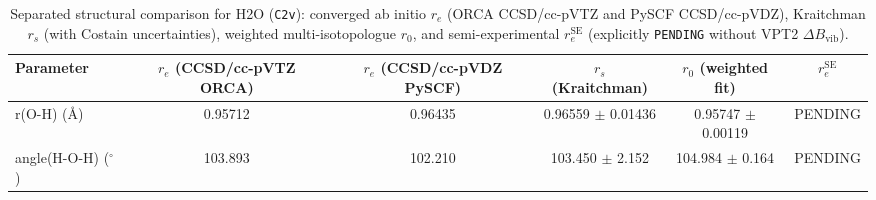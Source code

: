 \begin{table}[h!]
\centering
\caption{Separated structural comparison for H2O (\texttt{C2v}): converged ab initio $r_e$ (ORCA CCSD/cc-pVTZ and PySCF CCSD/cc-pVDZ), Kraitchman $r_s$ (with Costain uncertainties), weighted multi-isotopologue $r_0$, and semi-experimental $r_e^{\text{SE}}$ (explicitly \texttt{PENDING} without VPT2 $\Delta B_{\text{vib}}$).}
\begin{tabular}{l c c c c c}
\hline\hline
Parameter & $r_e$ (CCSD/cc-pVTZ ORCA) & $r_e$ (CCSD/cc-pVDZ PySCF) & $r_s$ (Kraitchman) & $r_0$ (weighted fit) & $r_e^{\text{SE}}$ \\
\hline
r(O-H) (\AA) & 0.95712 & 0.96435 & 0.96559 $\pm$ 0.01436 & 0.95747 $\pm$ 0.00119 & PENDING \\
angle(H-O-H) ($^\circ$) & 103.893 & 102.210 & 103.450 $\pm$ 2.152 & 104.984 $\pm$ 0.164 & PENDING \\
\hline\hline
\end{tabular}
\label{tab:geom_structural_comparison}
\end{table}
